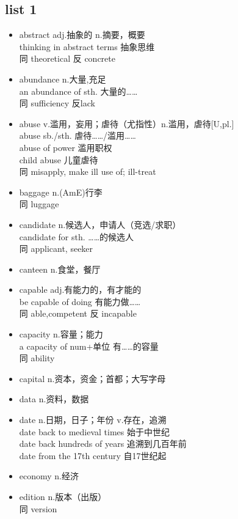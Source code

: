 \documentclass[11pt,a4paper,UTF8,titlepage]{ctexrep} %
\begin{document}
    \subsection{list 1}
    \begin{multicols}{2}
    \begin{itemize}
        \item abstract adj.抽象的 n.摘要，概要\\thinking in abstract terms 抽象思维\\同 theoretical 反 concrete
        \item abundance n.大量,充足\\an abundance of sth. 大量的……\\同 sufficiency 反lack
        \item abuse v.滥用，妄用；虐待（尤指性）n.滥用，虐待[U,pl.]\\abuse sb./sth. 虐待……/滥用……\\ abuse of power 滥用职权\\ child abuse 儿童虐待\\同 misapply, make ill use of; ill-treat
        \item baggage n.(AmE)行李 \\同 luggage
        \item candidate n.候选人，申请人（竞选/求职）\\candidate for sth. ……的候选人\\同 applicant, seeker
        \item canteen n.食堂，餐厅
        \item capable adj.有能力的，有才能的\\be capable of doing 有能力做……\\同 able,competent 反 incapable
        \item capacity n.容量；能力\\a capacity of num+单位 有……的容量\\同 ability
        \item capital n.资本，资金；首都；大写字母
        \item data n.资料，数据
        \item date n.日期，日子；年份 v.存在，追溯\\date back to medieval times 始于中世纪\\date back hundreds of years 追溯到几百年前\\date from the 17th century 自17世纪起
        \item economy n.经济
        \item edition n.版本（出版）\\同 version

\end{itemize}
\end{multicols}
\end{document}
